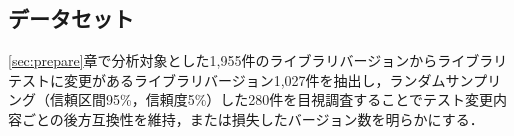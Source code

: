 \documentclass[submit]{ipsj}
\begin{document}




\subsection{データセット}\label{rq1:datasets}

\ref{sec:prepare}章で分析対象とした1,955件のライブラリバージョンからライブラリテストに変更があるライブラリバージョン1,027件を抽出し，ランダムサンプリング（信頼区間95\%，信頼度5\%）した280件を目視調査することでテスト変更内容ごとの後方互換性を維持，または損失したバージョン数を明らかにする．
\end{document}
